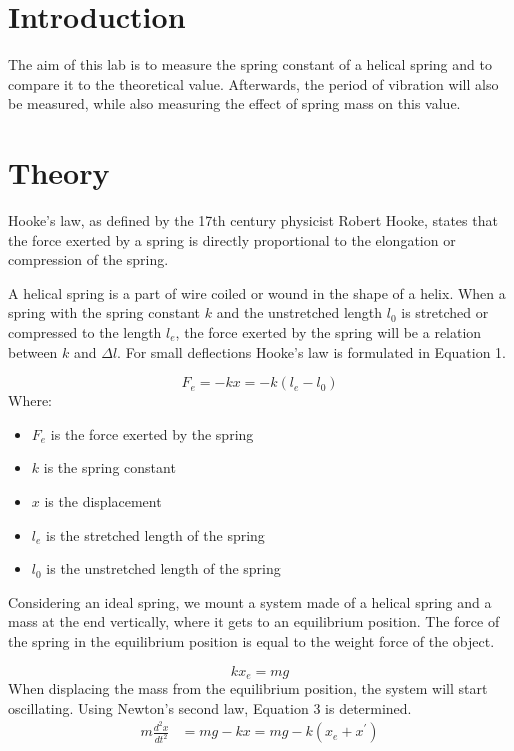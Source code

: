\documentclass[a4paper, 10pt]{article}
\begin{document}
\begin{flushleft}
\section{Introduction}
The aim of this lab is to measure the spring constant of a helical spring and to
compare it to the theoretical value. Afterwards, the period of vibration will also be
measured, while also measuring the effect of spring mass on this value.
\section{Theory}
Hooke's law, as defined by the 17th century physicist Robert Hooke, states that
the force exerted by a spring is directly proportional to the elongation or
compression of the spring.
\par
A helical spring is a part of wire coiled or wound in the shape of a helix. When
a spring with the spring constant $k$ and the unstretched length $l_0$ is
stretched or compressed to the length $l_e$, the force exerted by the spring
will be a relation between $k$ and $\Delta l$. For small deflections Hooke's law
is formulated in Equation 1.
\par
\begin{equation}
    F_e = -kx = -k(l_e - l_0)
\end{equation}
Where:
\begin{itemize}
    \item $F_e$ is the force exerted by the spring
    \item $k$ is the spring constant
    \item $x$ is the displacement
    \item $l_e$ is the stretched length of the spring
    \item $l_0$ is the unstretched length of the spring
\end{itemize}
Considering an ideal spring, we mount a system made of a helical spring and a
mass at the end vertically, where it gets to an equilibrium position. The force
of the spring in the equilibrium position is equal to the weight force of the
object.
\par
\begin{equation}  \label{eq:2}
    k x_e = mg 
\end{equation}
When displacing the mass from the equilibrium position, the system will start
oscillating.
Using Newton's second law, Equation 3 is determined.
\begin{align} 
    m \frac{d^2 x}{d t^2} &= mg - kx = mg - k (x_e + x^{\prime}) \\

\end{align}
\end{flushleft}
\end{document}

